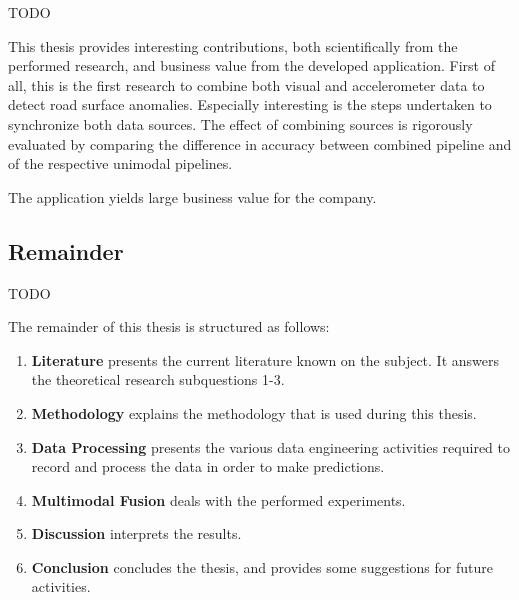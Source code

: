 TODO

This thesis provides interesting contributions, both scientifically from the performed research, and business value from the developed application. First of all, this is the first research to combine both visual and accelerometer data to detect road surface anomalies. Especially interesting is the steps undertaken to synchronize both data sources. The effect of combining sources is rigorously evaluated by comparing the difference in accuracy between combined pipeline and of the respective unimodal pipelines. 

The application yields large business value for the company. 


\subsection{Remainder}

TODO

The remainder of this thesis is structured as follows:

\begin{enumerate}
\addtocounter{enumi}{1}
\item \textbf{Literature} presents the current literature known on the subject. It answers the theoretical research subquestions 1-3. 
\item \textbf{Methodology} explains the methodology that is used during this thesis.
\item \textbf{Data Processing} presents the various data engineering activities required to record and process the data in order to make predictions.
\item \textbf{Multimodal Fusion} deals with the performed experiments.
\item \textbf{Discussion} interprets the results.
\item \textbf{Conclusion} concludes the thesis, and provides some suggestions for future activities.

\end{enumerate}

